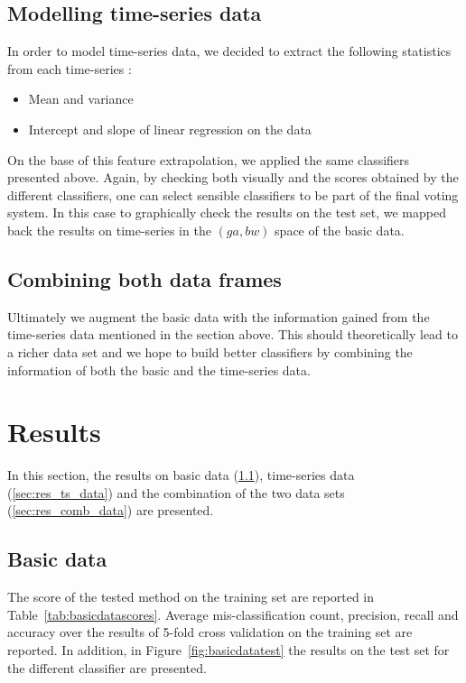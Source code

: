 \documentclass[a4paper,11pt]{article}
\begin{document}
\subsection{Modelling time-series data}
In order to model time-series data, we decided to extract the following statistics from each time-series \cite{GP-class}:
\begin{itemize}
    \item Mean and variance
    \item Intercept and slope of linear regression on the data
\end{itemize}

On the base of this feature extrapolation, we applied the same classifiers presented above. Again, by checking both visually and the scores obtained by the different classifiers, one can select sensible classifiers to be part of the final voting system. In this case to graphically check the results on the test set, we mapped back the results on time-series in the $(ga, bw)$ space of the basic data.

\subsection{Combining both data frames}

Ultimately we augment the basic data with the information gained from the time-series data mentioned in the section above. This should theoretically lead to a richer data set and we hope to build better classifiers by combining the information of both the basic and the time-series data.

\section{Results}
In this section, the results on basic data (\ref{sec:res_basic_data}), time-series data (\ref{sec:res_ts_data}) and the combination of the two data sets (\ref{sec:res_comb_data}) are presented.

\subsection{Basic data}\label{sec:res_basic_data}
The score of the tested method on the training set are reported in Table~\ref{tab:basicdatascores}. Average mis-classification count, precision, recall and accuracy over the results of 5-fold cross validation on the training set are reported. In addition, in Figure~\ref{fig:basicdatatest} the results on the test set for the different classifier are presented.
\end{document}
